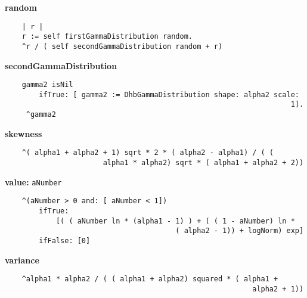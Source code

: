{\bf random}
\begin{verbatim}
    | r |
    r := self firstGammaDistribution random.
    ^r / ( self secondGammaDistribution random + r)

\end{verbatim}
{\bf secondGammaDistribution}
\begin{verbatim}
    gamma2 isNil
        ifTrue: [ gamma2 := DhbGammaDistribution shape: alpha2 scale: 
                                                                   1].
     ^gamma2

\end{verbatim}
{\bf skewness}
\begin{verbatim}
    ^( alpha1 + alpha2 + 1) sqrt * 2 * ( alpha2 - alpha1) / ( ( 
                       alpha1 * alpha2) sqrt * ( alpha1 + alpha2 + 2))

\end{verbatim}
{\bf value:} {\tt aNumber}
\begin{verbatim}
    ^(aNumber > 0 and: [ aNumber < 1]) 
        ifTrue: 
            [( ( aNumber ln * (alpha1 - 1) ) + ( ( 1 - aNumber) ln * 
                                        ( alpha2 - 1)) + logNorm) exp]
        ifFalse: [0]

\end{verbatim}
{\bf variance}
\begin{verbatim}
    ^alpha1 * alpha2 / ( ( alpha1 + alpha2) squared * ( alpha1 + 
                                                          alpha2 + 1))

\end{verbatim}

